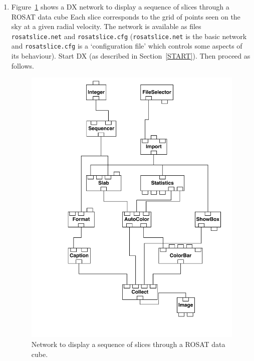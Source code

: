 \documentclass[twoside,11pt]{starlink}
\begin{document}
\begin{enumerate}
  \item Figure~\ref{ROSATSLICE} shows a DX network to display a sequence
   of slices through a ROSAT data cube Each slice corresponds to the
   grid of points seen on the sky at a given radial velocity.  The network
   is available as files \texttt{rosatslice.net} and \texttt{rosatslice.cfg}
   (\texttt{rosatslice.net} is the basic network and \texttt{rosatslice.cfg} is
   a `configuration file' which controls some aspects of its behaviour).
   Start DX (as described in Section~\ref{START}).  Then proceed as
   follows.

  \begin{figure}[htbp]

  \begin{center}
  \leavevmode
  \includegraphics[width=450pt]{sc2_rosatslice}
  \end{center}

  \caption[Network to display a sequence of slices through a ROSAT
   data cube.]{Network to display a sequence of slices through a ROSAT
   data cube. \label{ROSATSLICE} }


\end{figure}
\end{enumerate}
\end{document}
